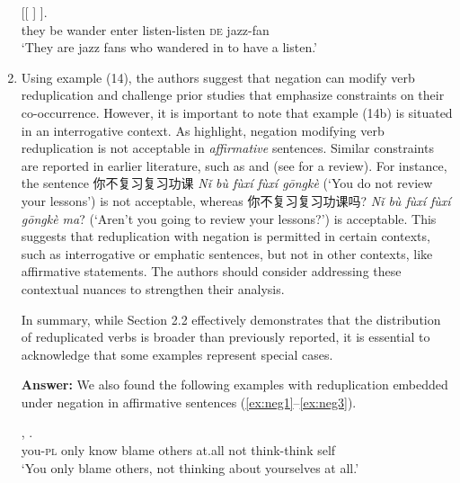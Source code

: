 \documentclass[fleqn,twoside]{article}
\begin{document}
\begin{enumerate}
    
    \ex\label{ex:rel2}
    \gll {}  [[   ] ].\\
    they be wander enter listen-listen \textsc{de} jazz-fan\\ 
    \glt `They are jazz fans who wandered in to have a listen.'
 
 \z  
    
    \item Using example (14), the authors suggest that negation can modify verb reduplication and challenge prior studies that emphasize constraints on their co-occurrence. However, it is important to note that example (14b) is situated in an interrogative context. As \citet{SuiHu2016} highlight, negation modifying verb reduplication is not acceptable in \textit{affirmative} sentences. Similar constraints are reported in earlier literature, such as \citet{Shen1995} and \citet{Liu1983} (see \citealt{Xie2018} for a review).
    For instance, the sentence 你不复习复习功课 \textit{Nǐ bù fùxí fùxí gōngkè} (`You do not review your lessons’) is not acceptable, whereas 你不复习复习功课吗? \textit{Nǐ
    bù fùxí fùxí gōngkè ma}? (`Aren't you going to review your lessons?') is acceptable. This suggests that reduplication with negation is permitted in certain contexts, such as interrogative or emphatic sentences, but not in other contexts, like affirmative statements. The authors should consider addressing these contextual nuances to strengthen their analysis.
    
    In summary, while Section 2.2 effectively demonstrates that the distribution of reduplicated verbs is broader than previously reported, it is essential to acknowledge that some examples represent special cases.
    
    \noindent
    \textbf{Answer:} We also found the following examples with reduplication embedded under negation in affirmative sentences (\ref{ex:neg1}--\ref{ex:neg3}).
    
\ea\label{ex:neg1}
\gll {}    ,    .\\
you-\textsc{pl} only know blame others at.all not think-think self\\ 
\glt `You only blame others, not thinking about yourselves at all.'
        

\end{enumerate}
\end{document}
